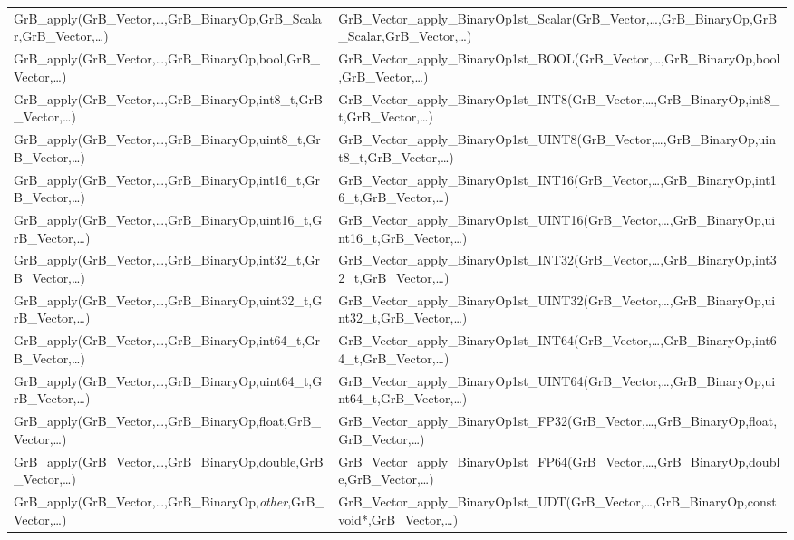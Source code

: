 \begin{landscape}
\begin{table}[htb]
{\begin{tabular}{l|l}
{\sf GrB\_apply(GrB\_Vector,\ldots,GrB\_BinaryOp,GrB\_Scalar,GrB\_Vector,\ldots)}		& {\sf GrB\_Vector\_apply\_BinaryOp1st\_Scalar(GrB\_Vector,\ldots,GrB\_BinaryOp,GrB\_Scalar,GrB\_Vector,\ldots)} \\
{\sf GrB\_apply(GrB\_Vector,\ldots,GrB\_BinaryOp,bool,GrB\_Vector,\ldots)}		& {\sf GrB\_Vector\_apply\_BinaryOp1st\_BOOL(GrB\_Vector,\ldots,GrB\_BinaryOp,bool,GrB\_Vector,\ldots)} \\
{\sf GrB\_apply(GrB\_Vector,\ldots,GrB\_BinaryOp,int8\_t,GrB\_Vector,\ldots)}	& {\sf GrB\_Vector\_apply\_BinaryOp1st\_INT8(GrB\_Vector,\ldots,GrB\_BinaryOp,int8\_t,GrB\_Vector,\ldots)} \\
{\sf GrB\_apply(GrB\_Vector,\ldots,GrB\_BinaryOp,uint8\_t,GrB\_Vector,\ldots)}	& {\sf GrB\_Vector\_apply\_BinaryOp1st\_UINT8(GrB\_Vector,\ldots,GrB\_BinaryOp,uint8\_t,GrB\_Vector,\ldots)} \\
{\sf GrB\_apply(GrB\_Vector,\ldots,GrB\_BinaryOp,int16\_t,GrB\_Vector,\ldots)}	& {\sf GrB\_Vector\_apply\_BinaryOp1st\_INT16(GrB\_Vector,\ldots,GrB\_BinaryOp,int16\_t,GrB\_Vector,\ldots)} \\
{\sf GrB\_apply(GrB\_Vector,\ldots,GrB\_BinaryOp,uint16\_t,GrB\_Vector,\ldots)}	& {\sf GrB\_Vector\_apply\_BinaryOp1st\_UINT16(GrB\_Vector,\ldots,GrB\_BinaryOp,uint16\_t,GrB\_Vector,\ldots)} \\
{\sf GrB\_apply(GrB\_Vector,\ldots,GrB\_BinaryOp,int32\_t,GrB\_Vector,\ldots)}	& {\sf GrB\_Vector\_apply\_BinaryOp1st\_INT32(GrB\_Vector,\ldots,GrB\_BinaryOp,int32\_t,GrB\_Vector,\ldots)} \\
{\sf GrB\_apply(GrB\_Vector,\ldots,GrB\_BinaryOp,uint32\_t,GrB\_Vector,\ldots)}	& {\sf GrB\_Vector\_apply\_BinaryOp1st\_UINT32(GrB\_Vector,\ldots,GrB\_BinaryOp,uint32\_t,GrB\_Vector,\ldots)} \\
{\sf GrB\_apply(GrB\_Vector,\ldots,GrB\_BinaryOp,int64\_t,GrB\_Vector,\ldots)}	& {\sf GrB\_Vector\_apply\_BinaryOp1st\_INT64(GrB\_Vector,\ldots,GrB\_BinaryOp,int64\_t,GrB\_Vector,\ldots)} \\
{\sf GrB\_apply(GrB\_Vector,\ldots,GrB\_BinaryOp,uint64\_t,GrB\_Vector,\ldots)}	& {\sf GrB\_Vector\_apply\_BinaryOp1st\_UINT64(GrB\_Vector,\ldots,GrB\_BinaryOp,uint64\_t,GrB\_Vector,\ldots)} \\
{\sf GrB\_apply(GrB\_Vector,\ldots,GrB\_BinaryOp,float,GrB\_Vector,\ldots)}		& {\sf GrB\_Vector\_apply\_BinaryOp1st\_FP32(GrB\_Vector,\ldots,GrB\_BinaryOp,float,GrB\_Vector,\ldots)} \\
{\sf GrB\_apply(GrB\_Vector,\ldots,GrB\_BinaryOp,double,GrB\_Vector,\ldots)}	& {\sf GrB\_Vector\_apply\_BinaryOp1st\_FP64(GrB\_Vector,\ldots,GrB\_BinaryOp,double,GrB\_Vector,\ldots)} \\
{\sf GrB\_apply(GrB\_Vector,\ldots,GrB\_BinaryOp,\emph{other},GrB\_Vector,\ldots)}		& {\sf GrB\_Vector\_apply\_BinaryOp1st\_UDT(GrB\_Vector,\ldots,GrB\_BinaryOp,const void*,GrB\_Vector,\ldots)} \\
\hline


\end{tabular}}
\end{table}
\end{landscape}
